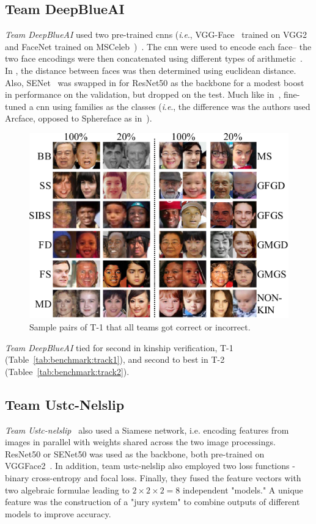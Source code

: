 \documentclass[letterpaper, 10 pt, conference]{ieeeconf}
\newcommand{\ie}{\textit{i}.\textit{e}., }
\begin{document}
\subsection{Team DeepBlueAI}
\emph{Team DeepBlueAI} used two pre-trained \acp{cnn} (\ie VGG-Face~\cite{schroff2015facenet} trained on VGG2~\cite{cao2018vggface2} and FaceNet trained on MSCeleb~\cite{guo2016ms})~\cite{id3}. The \acs{cnn} were used to encode each face-- the two face encodings were then concatenated using different types of arithmetic~\cite{id6, id8}. In \cite{id3}, the distance between faces was then determined using euclidean distance. Also, SENet~\cite{iandola2016squeezenet} was swapped in for ResNet50 as the backbone for a modest boost in performance on the validation, but dropped on the test. Much like in~\cite{robinson2018visual}, \cite{id3} fine-tuned a \ac{cnn} using families as the classes (\ie the difference was the authors used Arcface, opposed to Sphereface as in~\cite{robinson2018visual}).
\begin{figure}[t!]
    \centering
    \includegraphics[width =.9\linewidth]{figures/track1-samples-submitted-crop.pdf}
    \caption{Sample pairs of T-1 that all teams got correct or incorrect.}
    \label{fig:track1:samples:submitted}
    \vspace{-6mm}
\end{figure}

\emph{Team DeepBlueAI} tied for second in kinship verification, T-1 (Table~\ref{tab:benchmark:track1}), and second to best in T-2 (Tablee~\ref{tab:benchmark:track2}).

\subsection{Team Ustc-Nelslip}
\emph{Team Ustc-nelslip}~\cite{id6} also used a Siamese network, i.e. encoding features from images in parallel with weights shared across the two image processings. ResNet50 or SENet50 was used as the backbone, both pre-trained on VGGFace2~\cite{cao2018vggface2}. In addition, team ustc-nelslip also employed two loss functions - binary cross-entropy and focal loss. Finally, they fused the feature vectors with two algebraic formulae leading to \( 2 \times 2 \times 2 = 8 \) independent "models." A unique feature was the construction of a "jury system" to combine outputs of different models to improve accuracy.
\end{document}

